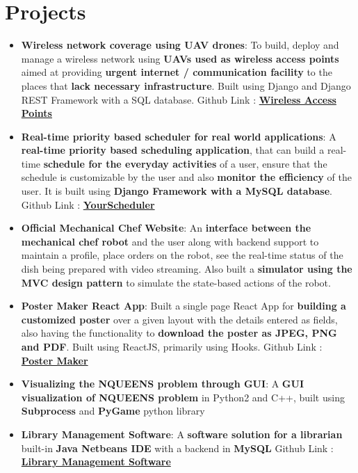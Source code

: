 \documentclass[a4paper,timesnewroman,11pt, twoside]{article}
\numberwithin{equation}{section}
\newcommand{\resumeItem}[2]{
  \item\small{
    \textbf{#1}{: #2 \vspace{-5pt}}
  }
}
\newcommand{\resumeSubItem}[2]{\resumeItem{#1}{#2}\vspace{-3pt}}
\newcommand{\resumeSubHeadingListStart}{\begin{itemize}[leftmargin=*]}
\newcommand{\resumeSubHeadingListEnd}{\end{itemize}}
\begin{document}

\section{Projects}
  \resumeSubHeadingListStart
    \resumeSubItem{Wireless network coverage using UAV drones}
    { To build, deploy and manage a wireless network using \textbf{UAVs used as wireless access points} aimed at providing \textbf{urgent internet / communication facility} to the places that \textbf{lack necessary infrastructure}. Built using Django and Django REST Framework with a SQL database. Github Link : \href{https://github.com/SaxenaKartik/MP2}{\textbf{Wireless Access Points}}
    }
    \resumeSubItem{Real-time priority based scheduler for real world applications}
    { A \textbf{real-time priority based scheduling application}, that can build a real-time \textbf{schedule for the everyday activities} of a user, ensure that the schedule is customizable by the user and also \textbf{monitor the efficiency} of the user. It is built using \textbf{Django Framework with a MySQL database}. Github Link : \href{https://github.com/SaxenaKartik/MP1}{\textbf{YourScheduler}}
    }
    \resumeSubItem{Official Mechanical Chef Website}
      {An \textbf{interface between the mechanical chef robot} and the user along with backend support to maintain a profile, place orders on the robot, see the real-time status of the dish being prepared with video streaming. Also built a \textbf{simulator using the MVC design pattern} to simulate the state-based actions of the robot.}
    \resumeSubItem{Poster Maker React App}
      {Built a single page React App for \textbf{building a customized poster} over a given layout with the details entered as fields, also having the functionality to \textbf{download the poster as JPEG, PNG and PDF}. Built using ReactJS, primarily using Hooks. Github Link : \href{/https://github.com/SaxenaKartik/Heuristics-Poster}{\textbf{Poster Maker}}
      } 
    \resumeSubItem{Visualizing the NQUEENS problem through GUI}
      {A \textbf{GUI visualization of NQUEENS problem} in Python2 and C++, built using \textbf{Subprocess} and \textbf{PyGame} python library}
    \resumeSubItem{Library Management Software}
      {A \textbf{software solution for a librarian} built-in \textbf{Java Netbeans IDE} with a backend in \textbf{MySQL} Github Link : \href{https://github.com/SaxenaKartik/Library-Management-Software}{\textbf{Library Management Software}}
      }
  \resumeSubHeadingListEnd
\end{document}
